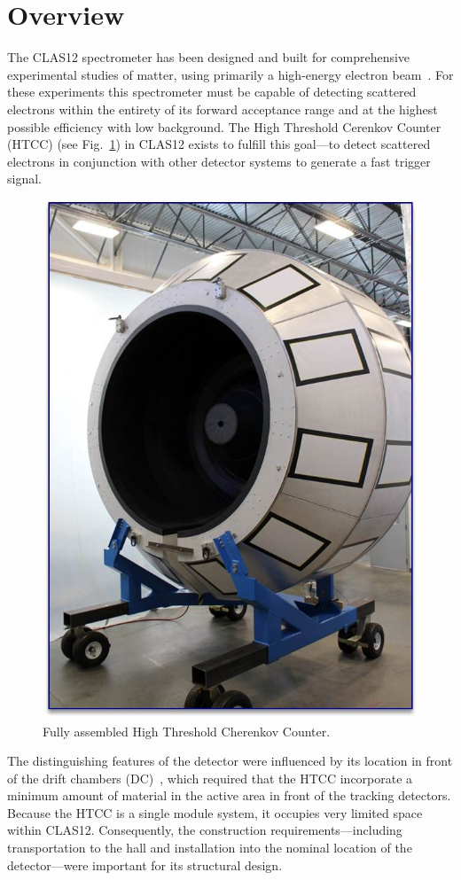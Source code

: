 \section{Overview}

The CLAS12 spectrometer has been designed and built for comprehensive experimental studies of matter,
using primarily a high-energy electron beam~\cite{clas12-nim}. For these experiments this spectrometer
must be capable of detecting scattered electrons within the entirety of its forward acceptance range
and at the highest possible efficiency with low background. The High Threshold Cerenkov Counter (HTCC) (see
Fig.~\ref{fig:Picture1}) in CLAS12 exists to fulfill this goal---to detect scattered electrons in conjunction with
other detector systems to generate a fast trigger signal. 

\begin{figure}[ht]
    \centering
    \includegraphics[width=0.75\linewidth]{images/Picture1.jpg}
    \caption{Fully assembled High Threshold Cherenkov Counter.}
    \label{fig:Picture1}
\end{figure}
The distinguishing features of the detector were influenced by its location in front of the drift chambers
(DC)~\cite{dc-nim}, which required that the HTCC incorporate a minimum amount of material in the active
area in front of the tracking detectors. Because the HTCC is a single module system, it occupies very limited
space within CLAS12. Consequently, the construction requirements---including transportation to the hall and
installation into the nominal location of the detector---were important for its structural design. 
